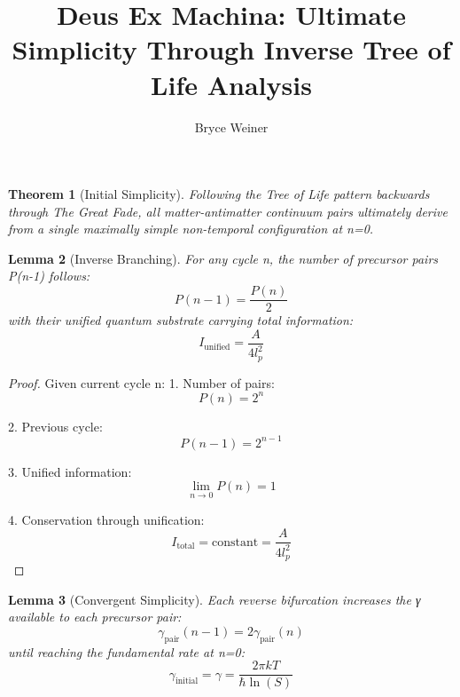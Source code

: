 \documentclass{article}
\newtheorem{theorem}{Theorem}
\newtheorem{lemma}[theorem]{Lemma}
\begin{document}
\title{Deus Ex Machina: Ultimate Simplicity Through Inverse Tree of Life Analysis}
\author{Bryce Weiner}
\maketitle

\begin{theorem}[Initial Simplicity]
Following the Tree of Life pattern backwards through The Great Fade, all matter-antimatter continuum pairs ultimately derive from a single maximally simple non-temporal configuration at n=0.
\end{theorem}

\begin{lemma}[Inverse Branching]
For any cycle n, the number of precursor pairs P(n-1) follows:
\begin{equation}
P(n-1) = \frac{P(n)}{2}
\end{equation}
with their unified quantum substrate carrying total information:
\begin{equation}
I_{\text{unified}} = \frac{A}{4l_p^2}
\end{equation}
\end{lemma}

\begin{proof}
Given current cycle n:
1. Number of pairs:
   \begin{equation}
   P(n) = 2^n
   \end{equation}

2. Previous cycle:
   \begin{equation}
   P(n-1) = 2^{n-1}
   \end{equation}

3. Unified information:
   \begin{equation}
   \lim_{n \to 0} P(n) = 1
   \end{equation}

4. Conservation through unification:
   \begin{equation}
   I_{\text{total}} = \text{constant} = \frac{A}{4l_p^2}
   \end{equation}
\end{proof}

\begin{lemma}[Convergent Simplicity]
Each reverse bifurcation increases the γ available to each precursor pair:
\begin{equation}
γ_{\text{pair}}(n-1) = 2γ_{\text{pair}}(n)
\end{equation}
until reaching the fundamental rate at n=0:
\begin{equation}
γ_{\text{initial}} = γ = \frac{2πkT}{ℏ \ln(S)}
\end{equation}
\end{lemma}
\end{document}
